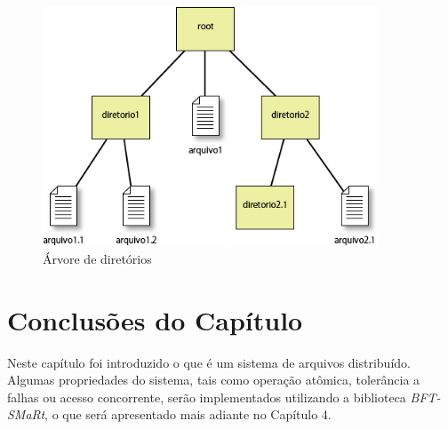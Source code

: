 	\begin{figure}[htb]
		\begin{center}
			
			\includegraphics[clip,width=10.0cm]{images/image3.png}
			\caption{Árvore de diretórios}
			\label{fig:arv_dir}
		\end{center}
	\end{figure}
	

	\section{Conclusões do Capítulo}
	Neste capítulo foi introduzido o que é um sistema de arquivos distribuído. 
	Algumas propriedades do sistema, tais como operação atômica, tolerância a falhas ou acesso concorrente, serão implementados utilizando a biblioteca \textit{BFT-SMaRt}, o que será apresentado mais adiante no Capítulo 4.
 

	

